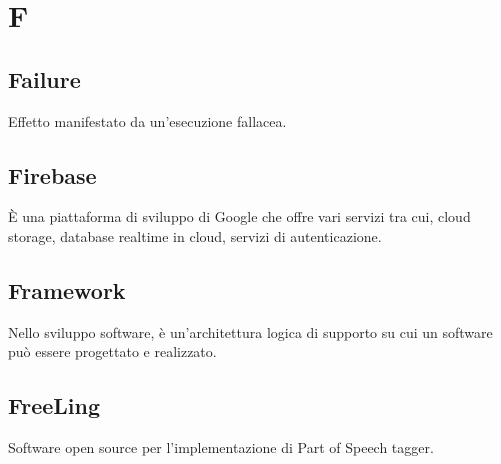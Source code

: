 \section*{F}

\subsection{Failure}
Effetto manifestato da un'esecuzione fallacea.

\subsection{Firebase}
È una piattaforma di sviluppo di Google che offre vari servizi tra cui, cloud storage, database realtime in cloud, servizi di autenticazione.

\subsection{Framework}
Nello sviluppo software, è un'architettura logica di supporto su cui un software può essere progettato e realizzato.

\subsection{FreeLing}
Software open source per l'implementazione di Part of Speech tagger.